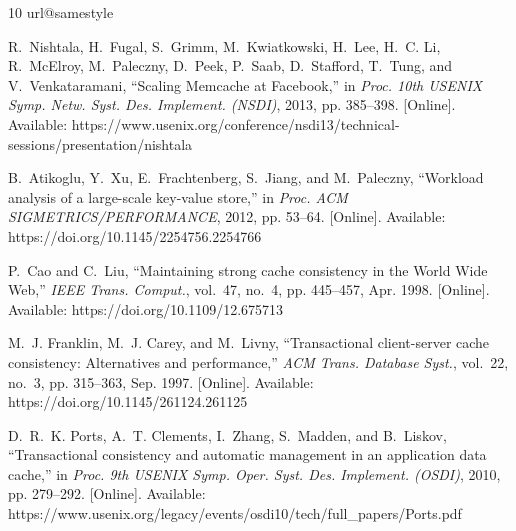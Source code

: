 \documentclass[conference]{IEEEtran}
\begin{document}
\begin{thebibliography}{10}
\providecommand{\url}[1]{#1}
\csname url@samestyle\endcsname
\providecommand{\newblock}{\relax}
\providecommand{\bibinfo}[2]{#2}
\providecommand{\BIBentrySTDinterwordspacing}{\spaceskip=0pt\relax}
\providecommand{\BIBentryALTinterwordstretchfactor}{4}
\providecommand{\BIBentryALTinterwordspacing}{\spaceskip=\fontdimen2\font plus
\BIBentryALTinterwordstretchfactor\fontdimen3\font minus
  \fontdimen4\font\relax}
\providecommand{\BIBforeignlanguage}[2]{{%
\expandafter\ifx\csname l@#1\endcsname\relax
\typeout{** WARNING: IEEEtran.bst: No hyphenation pattern has been}%
\typeout{** loaded for the language `#1'. Using the pattern for}%
\typeout{** the default language instead.}%
\else
\language=\csname l@#1\endcsname
\fi
#2}}
\providecommand{\BIBdecl}{\relax}
\BIBdecl

R.~Nishtala, H.~Fugal, S.~Grimm, M.~Kwiatkowski, H.~Lee, H.~C. Li, R.~McElroy,
  M.~Paleczny, D.~Peek, P.~Saab, D.~Stafford, T.~Tung, and V.~Venkataramani,
  ``Scaling {Memcache} at {Facebook},'' in \emph{Proc. 10th USENIX Symp. Netw.
  Syst. Des. Implement. (NSDI)}, 2013, pp. 385--398. [Online]. Available:
  \url{https://www.usenix.org/conference/nsdi13/technical-sessions/presentation/nishtala}

B.~Atikoglu, Y.~Xu, E.~Frachtenberg, S.~Jiang, and M.~Paleczny, ``Workload
  analysis of a large-scale key-value store,'' in \emph{Proc. ACM
  SIGMETRICS/PERFORMANCE}, 2012, pp. 53--64. [Online]. Available:
  \url{https://doi.org/10.1145/2254756.2254766}

P.~Cao and C.~Liu, ``Maintaining strong cache consistency in the {World Wide
  Web},'' \emph{IEEE Trans. Comput.}, vol.~47, no.~4, pp. 445--457, Apr. 1998.
  [Online]. Available: \url{https://doi.org/10.1109/12.675713}

M.~J. Franklin, M.~J. Carey, and M.~Livny, ``Transactional client-server cache
  consistency: Alternatives and performance,'' \emph{ACM Trans. Database
  Syst.}, vol.~22, no.~3, pp. 315--363, Sep. 1997. [Online]. Available:
  \url{https://doi.org/10.1145/261124.261125}

D.~R.~K. Ports, A.~T. Clements, I.~Zhang, S.~Madden, and B.~Liskov,
  ``Transactional consistency and automatic management in an application data
  cache,'' in \emph{Proc. 9th USENIX Symp. Oper. Syst. Des. Implement. (OSDI)},
  2010, pp. 279--292. [Online]. Available:
  \url{https://www.usenix.org/legacy/events/osdi10/tech/full_papers/Ports.pdf}


\end{thebibliography}
\end{document}
